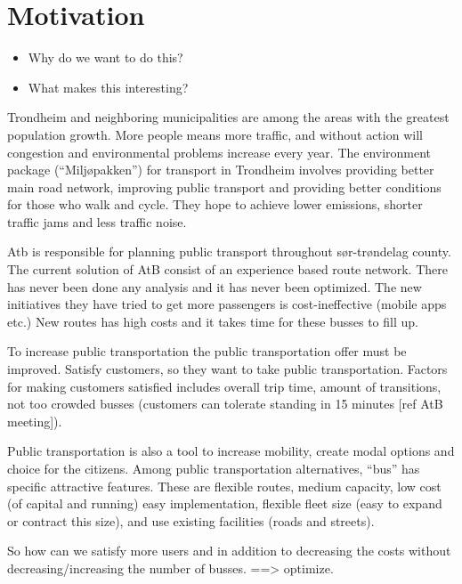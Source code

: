 \section{Motivation}
\begin{itemize}
\item Why do we want to do this?
\item What makes this interesting?
\end{itemize}

Trondheim and neighboring municipalities are among the areas with the greatest population growth. More people means more traffic, and without action will congestion and environmental problems increase every year. The environment package (“Miljøpakken”) for transport in Trondheim involves providing better main road network, improving public transport and providing better conditions for those who walk and cycle. They hope to achieve lower emissions, shorter traffic jams and less traffic noise.

Atb is responsible for planning public transport throughout sør-trøndelag county. The current solution of AtB consist of an experience based route network. There has never been done any analysis and it has never been optimized. The new initiatives they have tried to get more passengers is cost-ineffective (mobile apps etc.) New routes has high costs and it takes time for these busses to fill up.

To increase public transportation the public transportation offer must be improved. Satisfy customers, so they want to take public transportation. Factors for making customers satisfied includes overall trip time, amount of transitions, not too crowded busses (customers can tolerate standing in 15 minutes [ref AtB meeting]).

Public transportation is also a tool to increase mobility, create modal options and choice for the citizens. Among public transportation alternatives, “bus” has specific attractive features. These are flexible routes, medium capacity, low cost (of capital and running) easy implementation, flexible fleet size (easy to expand or contract this size), and use existing facilities (roads and streets). 

So how can we satisfy more users and in addition to decreasing the costs without decreasing/increasing the number of busses. ==> optimize. 





